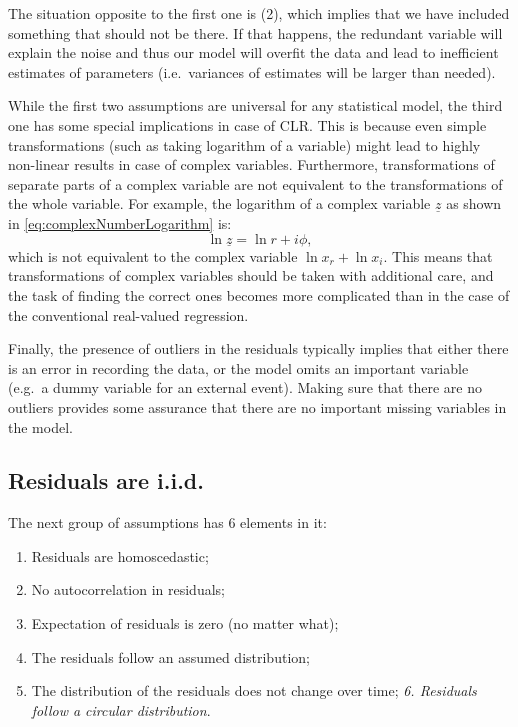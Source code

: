 \documentclass[
]{book}
\providecommand{\tightlist}{%
  \setlength{\itemsep}{0pt}\setlength{\parskip}{0pt}}
\begin{document}
The situation opposite to the first one is (2), which implies that we have included something that should not be there. If that happens, the redundant variable will explain the noise and thus our model will overfit the data and lead to inefficient estimates of parameters (i.e.~variances of estimates will be larger than needed).

While the first two assumptions are universal for any statistical model, the third one has some special implications in case of CLR. This is because even simple transformations (such as taking logarithm of a variable) might lead to highly non-linear results in case of complex variables. Furthermore, transformations of separate parts of a complex variable are not equivalent to the transformations of the whole variable. For example, the logarithm of a complex variable \(\underline{z}\) as shown in \eqref{eq:complexNumberLogarithm} is:
\begin{equation*}
    \ln \underline{z} = \ln r + i \phi ,
\end{equation*}
which is not equivalent to the complex variable \(\ln x_r + \ln x_i\). This means that transformations of complex variables should be taken with additional care, and the task of finding the correct ones becomes more complicated than in the case of the conventional real-valued regression.

Finally, the presence of outliers in the residuals typically implies that either there is an error in recording the data, or the model omits an important variable (e.g.~a dummy variable for an external event). Making sure that there are no outliers provides some assurance that there are no important missing variables in the model.

\hypertarget{residuals-are-i.i.d.}{%
\subsection{Residuals are i.i.d.}\label{residuals-are-i.i.d.}}

The next group of assumptions has 6 elements in it:

\begin{enumerate}
\def\labelenumi{\arabic{enumi}.}
\tightlist
\item
  Residuals are homoscedastic;
\item
  No autocorrelation in residuals;
\item
  Expectation of residuals is zero (no matter what);
\item
  The residuals follow an assumed distribution;
\item
  The distribution of the residuals does not change over time;
  \emph{6. Residuals follow a circular distribution}.
\end{enumerate}
\end{document}
